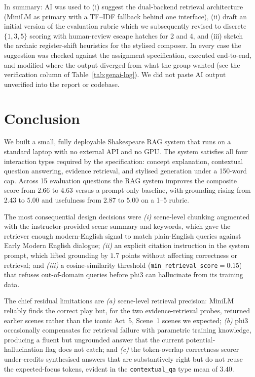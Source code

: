 \documentclass[10pt,conference]{IEEEtran}
\begin{document}
In summary: AI was used to (i) suggest the dual-backend retrieval
architecture (MiniLM as primary with a TF--IDF fallback behind one
interface), (ii) draft an initial version of the evaluation rubric
which we subsequently revised to discrete $\{1, 3, 5\}$ scoring with
human-review escape hatches for 2 and 4, and (iii) sketch the
archaic register-shift heuristics for the stylised composer. In
every case the suggestion was checked against the assignment
specification, executed end-to-end, and modified where the output
diverged from what the group wanted (see the verification column of
Table~\ref{tab:genai-log}). We did not paste AI output unverified
into the report or codebase.

\section{Conclusion}
\label{sec:conclusion}

We built a small, fully deployable Shakespeare RAG system that runs
on a standard laptop with no external API and no GPU. The system
satisfies all four interaction types required by the specification:
concept explanation, contextual question answering, evidence
retrieval, and stylised generation under a 150-word cap. Across 15
evaluation questions the RAG system improves the composite score
from $2.66$ to $4.63$ versus a prompt-only baseline, with grounding
rising from $2.43$ to $5.00$ and usefulness from $2.87$ to $5.00$
on a 1--5 rubric.

The most consequential design decisions were
\textit{(i)} scene-level chunking augmented with the
instructor-provided scene summary and keywords, which gave the
retriever enough modern-English signal to match plain-English
queries against Early Modern English dialogue;
\textit{(ii)} an explicit citation instruction in the system prompt,
which lifted grounding by $1.7$ points without affecting correctness
or retrieval; and
\textit{(iii)} a cosine-similarity threshold (\verb|min_retrieval_score|$=0.15$)
that refuses out-of-domain queries before phi3 can hallucinate from
its training data.

The chief residual limitations are
\textit{(a)} scene-level retrieval precision: MiniLM reliably finds
the correct play but, for the two evidence-retrieval probes, returned
earlier scenes rather than the iconic Act~5, Scene~1 scenes we
expected;
\textit{(b)} phi3 occasionally compensates for retrieval failure with
parametric training knowledge, producing a fluent but ungrounded
answer that the current potential-hallucination flag does not catch;
and
\textit{(c)} the token-overlap correctness scorer under-credits
synthesised answers that are substantively right but do not reuse
the expected-focus tokens, evident in the \texttt{contextual\_qa}
type mean of $3.40$.
\end{document}
